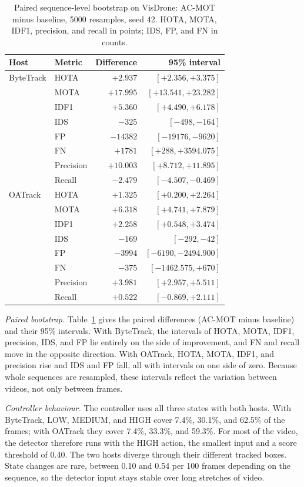 \documentclass[journal]{new-aiaa}
\begin{document}
\begin{table}[htbp]
\caption{Paired sequence-level bootstrap on VisDrone: AC-MOT minus baseline,
5000 resamples, seed 42. HOTA, MOTA, IDF1, precision, and recall in points;
IDS, FP, and FN in counts.}
\label{tab:bootstrap}
\centering\footnotesize
\setlength{\tabcolsep}{4pt}
\begin{tabular}{@{}llrr@{}}
\toprule
Host & Metric & Difference & 95\% interval\\
\midrule
ByteTrack & HOTA & $+2.937$ & $[+2.356, +3.375]$\\
 & MOTA & $+17.995$ & $[+13.541, +23.282]$\\
 & IDF1 & $+5.360$ & $[+4.490, +6.178]$\\
 & IDS & $-325$ & $[-498, -164]$\\
 & FP & $-14382$ & $[-19176, -9620]$\\
 & FN & $+1781$ & $[+288, +3594.075]$\\
 & Precision & $+10.003$ & $[+8.712, +11.895]$\\
 & Recall & $-2.479$ & $[-4.507, -0.469]$\\
\midrule
OATrack & HOTA & $+1.325$ & $[+0.200, +2.264]$\\
 & MOTA & $+6.318$ & $[+4.741, +7.879]$\\
 & IDF1 & $+2.258$ & $[+0.548, +3.474]$\\
 & IDS & $-169$ & $[-292, -42]$\\
 & FP & $-3994$ & $[-6190, -2494.900]$\\
 & FN & $-375$ & $[-1462.575, +670]$\\
 & Precision & $+3.981$ & $[+2.957, +5.511]$\\
 & Recall & $+0.522$ & $[-0.869, +2.111]$\\
\bottomrule
\end{tabular}
\end{table}

\emph{Paired bootstrap.} Table~\ref{tab:bootstrap} gives the paired differences (AC-MOT minus baseline)
and their 95\% intervals. With ByteTrack, the intervals of HOTA, MOTA, IDF1,
precision, IDS, and FP lie entirely on the side of improvement, and FN and
recall move in the opposite direction. With OATrack, HOTA, MOTA, IDF1, and
precision rise and IDS and FP fall, all with intervals on one side of zero.
Because whole sequences are resampled, these intervals reflect the variation
between videos, not only between frames.

\emph{Controller behaviour.} The controller uses all three states with both hosts. With ByteTrack, LOW,
MEDIUM, and HIGH cover 7.4\%, 30.1\%, and 62.5\% of the frames; with OATrack
they cover 7.4\%, 33.3\%, and 59.3\%. For most of the video, the detector
therefore runs with the HIGH action, the smallest input and a score threshold
of 0.40. The two hosts diverge through their different tracked boxes. State changes are rare, between 0.10 and 0.54 per 100
frames depending on the sequence, so the detector input stays stable over
long stretches of video.
\end{document}
